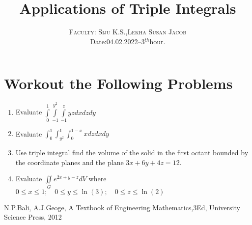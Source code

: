 \documentclass[twoside]{article}
\title{\vspace{-15mm}\fontsize{20pt}{15pt}\selectfont\textbf{Applications of Triple Integrals}} %
\author{
	\large
	\textsc{Faculty: Siju K.S.,Lekha Susan Jacob}\\
	\normalsize {Date:04.02.2022--3$^{th}$hour.} \\ 
	\vspace{-5mm}
}
\date{}
\begin{document}
	
	\maketitle %
	
	\thispagestyle{fancy} %
	\section{Workout the Following Problems}
	\begin{enumerate}
		\item Evaluate $\displaystyle \int\limits_0^1\int\limits_{-1}^{y^2}\int\limits_{-1}^zyzdxdzdy$
		\item Evaluate $\displaystyle \int_0^1\int_{y^2}^1\int_0^{1-x}xdzdxdy$
		\item Use triple integral find the volume of the solid in the first octant bounded by the coordinate planes and the  plane $3x+6y+4z=12$.
		\item Evaluate $\displaystyle \iint\limits_G e^{2x+y-z}dV$ where $0\leq x\leq 1;\quad 0\leq y\leq \ln(3);\quad 0\leq z\leq \ln(2)$
	\end{enumerate}
	
	\begin{thebibliography}{99} %
		 N.P.Bali, A.J.Geoge, A Textbook of Engineering Mathematics,3Ed, University Science Press, 2012
	\end{thebibliography}
	
	
\end{document}

